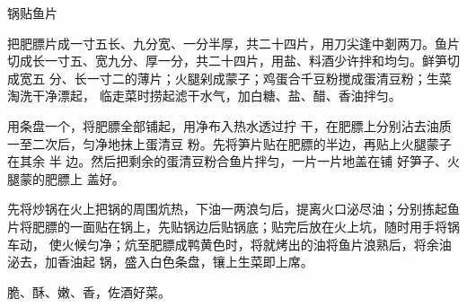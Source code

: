 \begin{recipe}{锅贴鱼片}

\ingredients


\preparation

\step 把肥膘片成一寸五长、九分宽、一分半厚，共二十四片，用刀尖逢中剗两刀。鱼片
切成长一寸五、宽九分、厚一分，共二十四片，用盐、料酒少许拌和均匀。鲜笋切成宽五
分、长一寸二的薄片；火腿剁成蒙子；鸡蛋合千豆粉搅成蛋清豆粉；生菜淘洗干净漂起，
临走菜时捞起滤干水气，加白糖、盐、醋、香油拌匀。

\step 用条盘一个，将肥膘全部铺起，用净布入热水透过拧 干，在肥膘上分别沾去油质
一至二次后，匀净地抹上蛋清豆 粉。先将笋片贴在肥膘的半边，再贴上火腿蒙子在其余
半 边。然后把剩余的蛋清豆粉合鱼片拌匀，一片一片地盖在铺 好笋子、火腿蒙的肥膘上
盖好。

\step 先将炒锅在火上把锅的周围炕热，下油一两浪匀后，提离火口泌尽油；分别拣起鱼
片将肥膘的一面贴在锅上，先贴锅边后贴锅底；贴完后放在火上坑，随时用手将锅车动，
使火候匀净；炕至肥膘成鸭黄色时，将就烤出的油将鱼片浪熟后，将余油泌去，加香油起
锅，盛入白色条盘，镶上生菜即上席。

\features

脆、酥、嫩、香，佐酒好菜。

\end{recipe}

